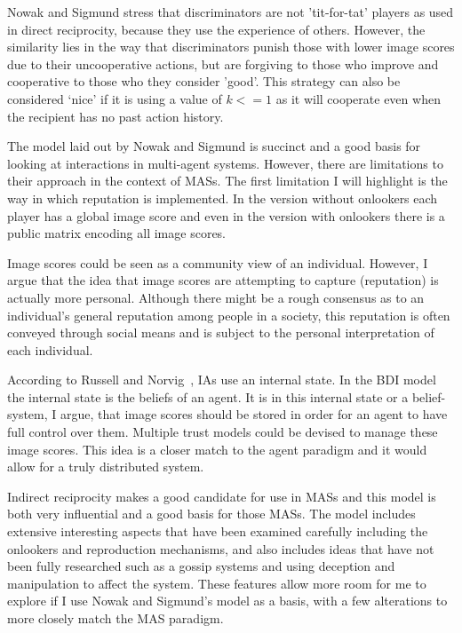 \documentclass[]{final_report}
\begin{document}
Nowak and Sigmund stress that discriminators are not 'tit-for-tat' players as used in direct reciprocity, because they use the experience of others. However, the similarity lies in the way that discriminators punish those with lower image scores due to their uncooperative actions, but are forgiving to those who improve and cooperative to those who they consider 'good'. This strategy can also be considered `nice' if it is using a value of $k<=1$ as it will cooperate even when the recipient has no past action history.\par
The model laid out by Nowak and Sigmund is succinct and a good basis for looking at interactions in multi-agent systems. However, there are limitations to their approach in the context of MASs. The first limitation I will highlight is the way in which reputation is implemented. In the version without onlookers each player has a global image score and even in the version with onlookers there is a public matrix encoding all image scores.\par
Image scores could be seen as a community view of an individual. However, I argue that the idea that image scores are attempting to capture (reputation) is actually more personal. Although there might be a rough consensus as to an individual's general reputation among people in a society, this reputation is often conveyed through social means and is subject to the personal interpretation of each individual.\par
According to Russell and Norvig~\cite{russell2016artificial}, IAs use an internal state. In the BDI model~\cite{rao1995bdi} the internal state is the beliefs of an agent. It is in this internal state or a belief-system, I argue, that image scores should be stored in order for an agent to have full control over them. Multiple trust models could be devised to manage these image scores. This idea is a closer match to the agent paradigm and it would allow for a truly distributed system.\par
Indirect reciprocity makes a good candidate for use in MASs and this model is both very influential and a good basis for those MASs. The model includes extensive interesting aspects that have been examined carefully including the onlookers and reproduction mechanisms, and also includes ideas that have not been fully researched such as a gossip systems and using deception and manipulation to affect the system. These features allow more room for me to explore if I use Nowak and Sigmund's model as a basis, with a few alterations to more closely match the MAS paradigm.
\end{document}
